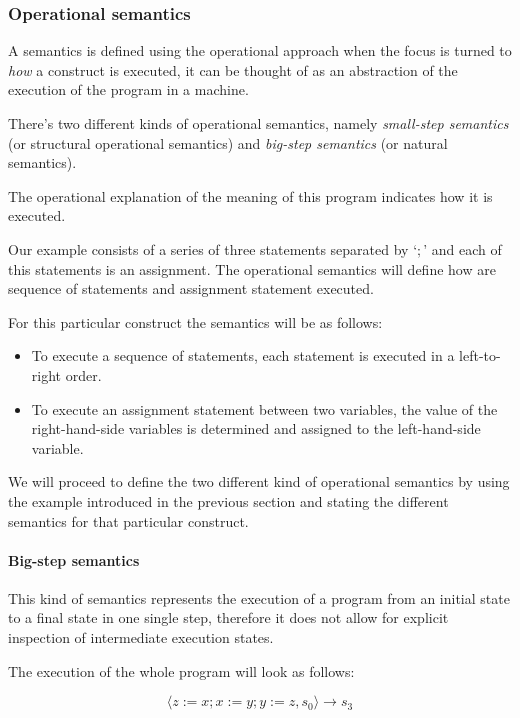 \subsubsection{Operational semantics}

A semantics is defined using the operational approach when the focus is turned to \textit{how} a construct is executed, it can be thought of as an abstraction of the execution of the program in a machine.~\parencite{nielson}

There's two different kinds of operational semantics, namely \textit{small-step semantics} (or structural operational semantics) and \textit{big-step semantics} (or natural semantics).

The operational explanation of the meaning of this program indicates how it is executed.

Our example consists of a series of three statements separated by `$;$' and each of this statements is an assignment.
The operational semantics will define how are sequence of statements and assignment statement executed.

For this particular construct the semantics will be as follows:

\begin{itemize}
\item{To execute a sequence of statements, each statement is executed in a left-to-right order.}
\item{To execute an assignment statement between two variables, the value of the right-hand-side variables is determined and assigned to the left-hand-side variable.}
\end{itemize}


We will proceed to define the two different kind of operational semantics by using the example introduced in the previous section and stating the different semantics for that particular construct.

\paragraph{Big-step semantics}

This kind of semantics represents the execution of a program from an initial state to a final state in one single step, therefore it does not allow for explicit inspection of intermediate execution states.~\parencite{nipkow}

The execution of the whole program will look as follows:

\begin{equation*}
\langle z:=x; x:=y; y:=z, s_{0} \rangle \rightarrow s_{3}
\end{equation*}

